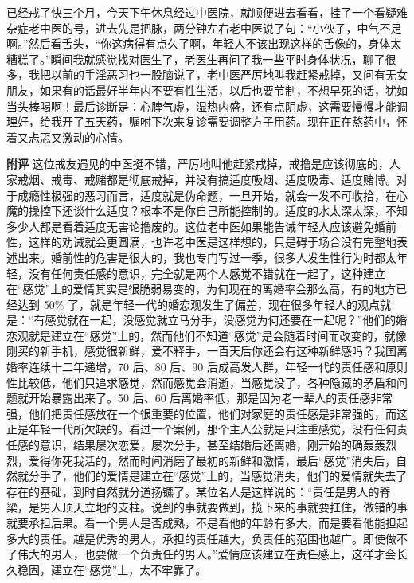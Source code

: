 \begin{case}
    已经戒了快三个月，今天下午休息经过中医院，就顺便进去看看，挂了一个看疑难杂症老中医的号，进去先是把脉，两分钟左右老中医说了句：“小伙子，中气不足啊。”然后看舌头，“你这病得有点久了啊，年轻人不该出现这样的舌像的，身体太糟糕了。”瞬间我就感觉找对医生了，老医生再问了我一些平时身体状况，聊了很多，我把以前的手淫恶习也一股脑说了，老中医严厉地叫我赶紧戒掉，又问有无女朋友，如果有的话最好半年内不要有性生活，以后也要节制，不想早死的话，犹如当头棒喝啊！最后诊断是：心脾气虚，湿热内盛，还有点阴虚，这需要慢慢才能调理好，给我开了五天药，嘱咐下次来复诊需要调整方子用药。现在正在熬药中，怀着又忐忑又激动的心情。

    \textbf{附评} 这位戒友遇见的中医挺不错，严厉地叫他赶紧戒掉，戒撸是应该彻底的，人家戒烟、戒毒、戒赌都是彻底戒掉，并没有搞适度吸烟、适度吸毒、适度赌博。对于成瘾性极强的恶习而言，适度就是伪命题，一旦开始，就会一发不可收拾，在心魔的操控下还谈什么适度？根本不是你自己所能控制的。适度的水太深太深，不知多少人都是看着适度无害论撸废的。这位老中医如果能告诫年轻人应该避免婚前性，这样的劝诫就会更圆满，也许老中医是这样想的，只是碍于场合没有完整地表述出来。婚前性的危害是很大的，我也专门写过一季，很多人发生性行为时都太年轻，没有任何责任感的意识，完全就是两个人感觉不错就在一起了，这种建立在“感觉”上的爱情其实是很脆弱易变的，为何现在的离婚率会那么高，有的地方已经达到 50\% 了，就是年轻一代的婚恋观发生了偏差，现在很多年轻人的观点就是：“有感觉就在一起，没感觉就立马分手，没感觉为何还要在一起呢？”他们的婚恋观就是建立在“感觉”上的，然而他们不知道“感觉”是会随着时间而改变的，就像刚买的新手机，感觉很新鲜，爱不释手，一百天后你还会有这种新鲜感吗？我国离婚率连续十二年递增，70 后、80 后、90 后成高发人群，年轻一代的责任感和原则性比较低，他们只追求感觉，然而感觉会消逝，当感觉没了，各种隐藏的矛盾和问题就开始暴露出来了。50 后、60 后离婚率低，那是因为老一辈人的责任感非常强，他们把责任感放在一个很重要的位置，他们对家庭的责任感是非常强的，而这正是年轻一代所欠缺的。看过一个案例，那个主人公就是只注重感觉，没有任何责任感的意识，结果屡次恋爱，屡次分手，甚至结婚后还离婚，刚开始的确轰轰烈烈，爱得你死我活的，然而时间消磨了最初的新鲜和激情，最后“感觉”消失后，自然就分手了，他们的爱情是建立在“感觉”上的，当感觉消失，他们的爱情就失去了存在的基础，到时自然就分道扬镳了。某位名人是这样说的：“责任是男人的脊梁，是男人顶天立地的支柱。说到的事就要做到，揽下来的事就要扛住，做错的事就要承担后果。看一个男人是否成熟，不是看他的年龄有多大，而是要看他能担起多大的责任。越是优秀的男人，承担的责任越大，负责任的范围也越广。即使做不了伟大的男人，也要做一个负责任的男人。”爱情应该建立在责任感上，这样才会长久稳固，建立在“感觉”上，太不牢靠了。


\end{case}
